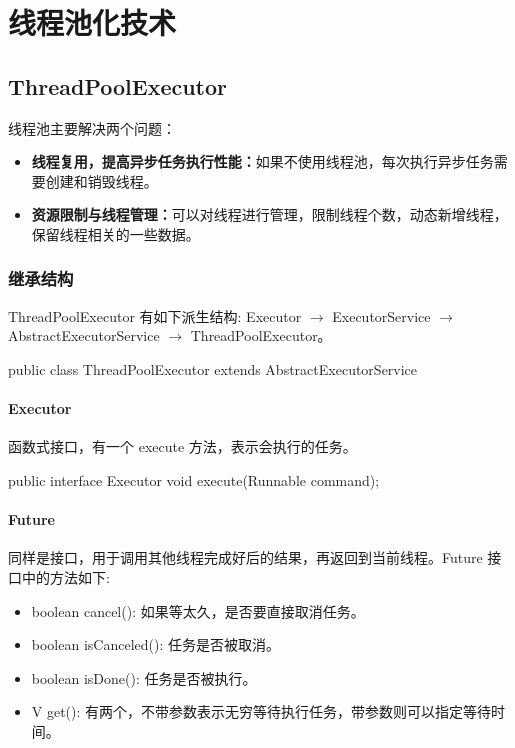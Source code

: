 \section{线程池化技术}

\subsection{ThreadPoolExecutor}

线程池主要解决两个问题：
\begin{itemize}
    \item \textbf{线程复用，提高异步任务执行性能：}如果不使用线程池，每次执行异步任务需要创建和销毁线程。
    \item \textbf{资源限制与线程管理：}可以对线程进行管理，限制线程个数，动态新增线程，保留线程相关的一些数据。
\end{itemize}

\subsubsection{继承结构}

ThreadPoolExecutor 有如下派生结构: Executor $\rightarrow$ ExecutorService $\rightarrow$ AbstractExecutorService $\rightarrow$ ThreadPoolExecutor。

\begin{Java}
public class ThreadPoolExecutor extends AbstractExecutorService
\end{Java}

\paragraph*{Executor} 函数式接口，有一个 execute 方法，表示会执行的任务。

\begin{Java}
public interface Executor {
    void execute(Runnable command);
}
\end{Java}

\paragraph*{Future} 同样是接口，用于调用其他线程完成好后的结果，再返回到当前线程。Future 接口中的方法如下:

\begin{itemize}
    \item boolean cancel(): 如果等太久，是否要直接取消任务。
    \item boolean isCanceled(): 任务是否被取消。
    \item boolean isDone(): 任务是否被执行。
    \item V get(): 有两个，不带参数表示无穷等待执行任务，带参数则可以指定等待时间。
\end{itemize}

